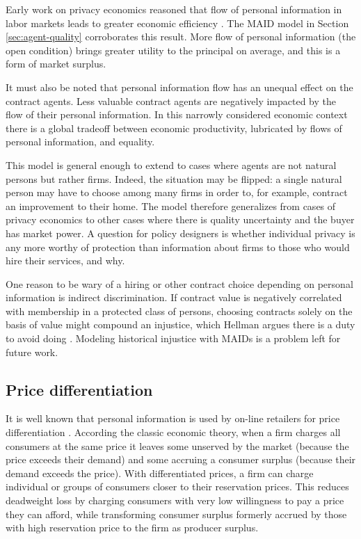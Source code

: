 \documentclass[../thesis.tex]{subfiles}
\begin{document}
Early work on privacy economics reasoned that
flow of personal information in labor markets
leads to greater economic efficiency \cite{posner1981economics}. 
The MAID model in Section \ref{sec:agent-quality}
corroborates this result.
More flow of personal information (the open condition)
brings greater utility to the principal
on average, and this is a form of market surplus.

It must also be noted that personal information flow
has an unequal effect on the contract agents.
Less valuable contract agents are negatively impacted
by the flow of their personal information.
In this narrowly considered economic context there 
is a global tradeoff between economic productivity,
lubricated by flows of personal information, and
equality.

This model is general enough to extend to cases where
agents are not natural persons but rather firms.
Indeed, the situation may be flipped: a single
natural person may have to choose among many firms
in order to, for example, contract an improvement to
their home.
The model therefore generalizes from cases of privacy
economics to other cases where there is quality uncertainty
and the buyer has market power.
A question for policy designers is whether individual
privacy is any more worthy of protection than
information about firms to those who would
hire their services, and why.

One reason to be wary of a hiring or other contract
choice depending on personal information is indirect
discrimination.
If contract value is negatively correlated with membership
in a protected class of persons, choosing contracts solely
on the basis of value might compound an injustice, which
Hellman argues there is a duty to avoid doing
\cite{hellman2017indirect}.
Modeling historical injustice with MAIDs is a problem
left for future work.

\subsection{Price differentiation}
\label{sec:price-differentiation}

It is well known that personal information
is used by on-line retailers for price differentiation 
\cite{shapiro1998information, varian2001economics}.
According the classic economic theory,
when a firm charges all consumers at the same price
it leaves
some unserved by the market (because the price
exceeds their demand) and some accruing a
consumer surplus (because their demand exceeds
the price).
With differentiated prices, a firm can charge
individual or groups of consumers
closer to their reservation prices. 
This reduces deadweight loss by
charging consumers with very low willingness to pay
a price they can afford, while transforming consumer
surplus formerly accrued by those with high reservation
price to the firm as producer surplus.
\end{document}
